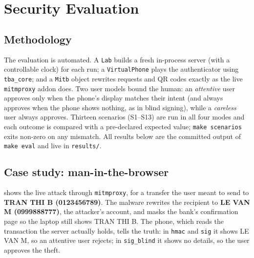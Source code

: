 \section{Security Evaluation}\label{sec:eval}

\subsection{Methodology}
The evaluation is automated. A \texttt{Lab} builds a fresh in-process server
(with a controllable clock) for each run; a \texttt{VirtualPhone} plays the
authenticator using \texttt{tba\_core}; and a \texttt{Mitb} object rewrites
requests and QR codes exactly as the live \texttt{mitmproxy} addon does. Two user
models bound the human: an \emph{attentive} user approves only when the phone's
display matches their intent (and always approves when the phone shows nothing,
as in blind signing), while a \emph{careless} user always approves. Thirteen
scenarios (S1--S13) are run in all four modes and each outcome is compared with a
pre-declared expected value; \texttt{make scenarios} exits non-zero on any
mismatch. All results below are the committed output of \texttt{make eval} and
live in \texttt{results/}.

\subsection{Case study: man-in-the-browser}
 shows the live attack through \texttt{mitmproxy}, for a transfer
the user meant to send to \textbf{TRAN THI B (0123456789)}. The malware rewrites
the recipient to \textbf{LE VAN M (0999888777)}, the attacker's account, and
masks the bank's confirmation page so the laptop still shows TRAN THI B. The
phone, which reads the transaction the server actually holds, tells the truth: in
\texttt{hmac} and \texttt{sig} it shows LE VAN M, so an attentive user rejects; in
\texttt{sig\_blind} it shows no details, so the user approves the theft.

